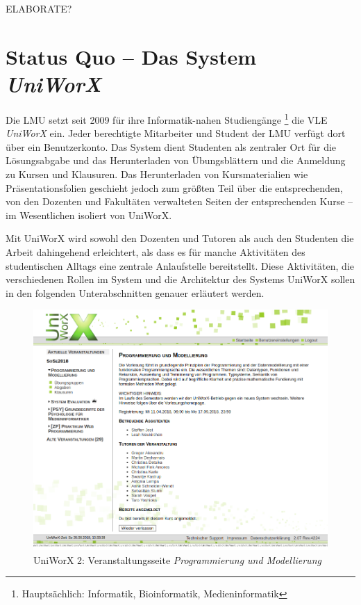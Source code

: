 \documentclass[11pt,a4paper,twoside,ngerman]{article}
\begin{document}
ELABORATE?

\clearpage
\section{Status Quo -- Das System \textit{UniWorX}} \label{sec:uniworx}
Die LMU setzt seit 2009 für ihre Informatik-nahen Studiengänge \footnote{Hauptsächlich: Informatik, Bioinformatik, Medieninformatik} die VLE \emph{UniWorX} ein. Jeder berechtigte Mitarbeiter und Student der LMU verfügt dort über ein Benutzerkonto. Das System dient Studenten als zentraler Ort für die Lösungsabgabe und das Herunterladen von Übungsblättern und die Anmeldung zu Kursen und Klausuren. Das Herunterladen von Kursmaterialien wie Präsentationsfolien geschieht jedoch zum größten Teil über die entsprechenden, von den Dozenten und Fakultäten verwalteten Seiten der entsprechenden Kurse -- im Wesentlichen isoliert von UniWorX.

Mit UniWorX wird sowohl den Dozenten und Tutoren als auch den Studenten die Arbeit dahingehend erleichtert, als dass es für manche Aktivitäten des studentischen Alltags eine zentrale Anlaufstelle bereitstellt. Diese Aktivitäten, die verschiedenen Rollen im System und die Architektur des Systems UniWorX sollen in den folgenden Unterabschnitten genauer erläutert werden.

\begin{figure}[h]
    \centering
    \includegraphics[width=.9\textwidth]{images/uniworx_promo.png}
    \caption{UniWorX 2: Veranstaltungsseite \textit{Programmierung und Modellierung}}
    \label{fig:uniworx_promo}
\end{figure}
\end{document}
